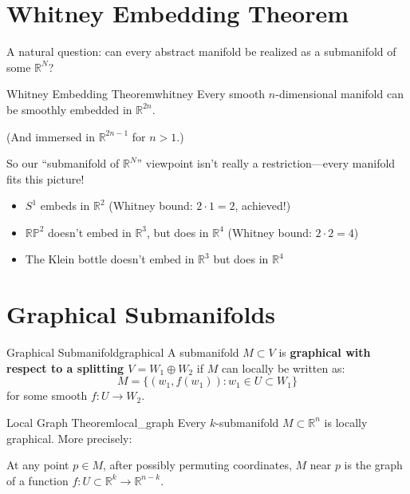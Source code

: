 \documentclass[11pt, letterpaper, openany]{book}
\begin{document}
\section{Whitney Embedding Theorem}

A natural question: can every abstract manifold be realized as a submanifold of some $\mathbb{R}^N$?

\begin{thm}{Whitney Embedding Theorem}{whitney}
Every smooth $n$-dimensional manifold can be smoothly embedded in $\mathbb{R}^{2n}$.

(And immersed in $\mathbb{R}^{2n-1}$ for $n > 1$.)
\end{thm}

\begin{remark}
So our ``submanifold of $\mathbb{R}^N$'' viewpoint isn't really a restriction---every manifold fits this picture!
\end{remark}

\begin{example}
\begin{itemize}
    \item $S^1$ embeds in $\mathbb{R}^2$ (Whitney bound: $2 \cdot 1 = 2$, achieved!)
    \item $\mathbb{RP}^2$ doesn't embed in $\mathbb{R}^3$, but does in $\mathbb{R}^4$ (Whitney bound: $2 \cdot 2 = 4$)
    \item The Klein bottle doesn't embed in $\mathbb{R}^3$ but does in $\mathbb{R}^4$
\end{itemize}
\end{example}

\section{Graphical Submanifolds}

\begin{defn}{Graphical Submanifold}{graphical}
A submanifold $M \subset V$ is \textbf{graphical with respect to a splitting $V = W_1 \oplus W_2$} if $M$ can locally be written as:
\[M = \{(w_1, f(w_1)) : w_1 \in U \subset W_1\}\]
for some smooth $f: U \to W_2$.
\end{defn}

\begin{thm}{Local Graph Theorem}{local_graph}
Every $k$-submanifold $M \subset \mathbb{R}^n$ is locally graphical. More precisely:

At any point $p \in M$, after possibly permuting coordinates, $M$ near $p$ is the graph of a function $f: U \subset \mathbb{R}^k \to \mathbb{R}^{n-k}$.
\end{thm}
\end{document}
